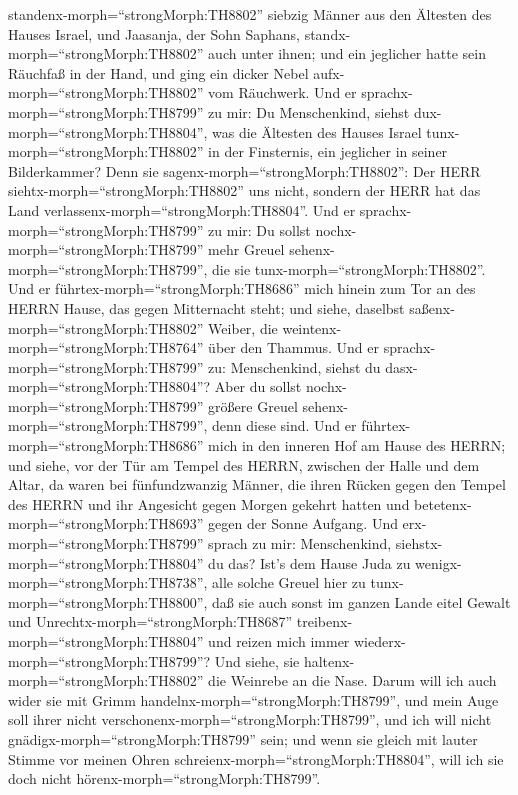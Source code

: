 standenx-morph=``strongMorph:TH8802'' siebzig Männer aus den Ältesten
des Hauses Israel, und Jaasanja, der Sohn Saphans,
standx-morph=``strongMorph:TH8802'' auch unter ihnen; und ein jeglicher
hatte sein Räuchfaß in der Hand, und ging ein dicker Nebel
aufx-morph=``strongMorph:TH8802'' vom Räuchwerk.  Und er
sprachx-morph=``strongMorph:TH8799'' zu mir: Du Menschenkind, siehst
dux-morph=``strongMorph:TH8804'', was die Ältesten des Hauses Israel
tunx-morph=``strongMorph:TH8802'' in der Finsternis, ein jeglicher in
seiner Bilderkammer? Denn sie sagenx-morph=``strongMorph:TH8802'': Der
HERR siehtx-morph=``strongMorph:TH8802'' uns nicht, sondern der HERR hat
das Land verlassenx-morph=``strongMorph:TH8804''.  Und er
sprachx-morph=``strongMorph:TH8799'' zu mir: Du sollst
nochx-morph=``strongMorph:TH8799'' mehr Greuel
sehenx-morph=``strongMorph:TH8799'', die sie
tunx-morph=``strongMorph:TH8802''.  Und er
führtex-morph=``strongMorph:TH8686'' mich hinein zum Tor an des HERRN
Hause, das gegen Mitternacht steht; und siehe, daselbst
saßenx-morph=``strongMorph:TH8802'' Weiber, die
weintenx-morph=``strongMorph:TH8764'' über den Thammus. 
Und er sprachx-morph=``strongMorph:TH8799'' zu: Menschenkind, siehst du
dasx-morph=``strongMorph:TH8804''? Aber du sollst
nochx-morph=``strongMorph:TH8799'' größere Greuel
sehenx-morph=``strongMorph:TH8799'', denn diese sind.  Und
er führtex-morph=``strongMorph:TH8686'' mich in den inneren Hof am Hause
des HERRN; und siehe, vor der Tür am Tempel des HERRN, zwischen der
Halle und dem Altar, da waren bei fünfundzwanzig Männer, die ihren
Rücken gegen den Tempel des HERRN und ihr Angesicht gegen Morgen gekehrt
hatten und betetenx-morph=``strongMorph:TH8693'' gegen der Sonne
Aufgang.  Und erx-morph=``strongMorph:TH8799'' sprach zu
mir: Menschenkind, siehstx-morph=``strongMorph:TH8804'' du das? Ist's
dem Hause Juda zu wenigx-morph=``strongMorph:TH8738'', alle solche
Greuel hier zu tunx-morph=``strongMorph:TH8800'', daß sie auch sonst im
ganzen Lande eitel Gewalt und Unrechtx-morph=``strongMorph:TH8687''
treibenx-morph=``strongMorph:TH8804'' und reizen mich immer
wiederx-morph=``strongMorph:TH8799''? Und siehe, sie
haltenx-morph=``strongMorph:TH8802'' die Weinrebe an die Nase.
 Darum will ich auch wider sie mit Grimm
handelnx-morph=``strongMorph:TH8799'', und mein Auge soll ihrer nicht
verschonenx-morph=``strongMorph:TH8799'', und ich will nicht
gnädigx-morph=``strongMorph:TH8799'' sein; und wenn sie gleich mit
lauter Stimme vor meinen Ohren schreienx-morph=``strongMorph:TH8804'',
will ich sie doch nicht hörenx-morph=``strongMorph:TH8799''.

